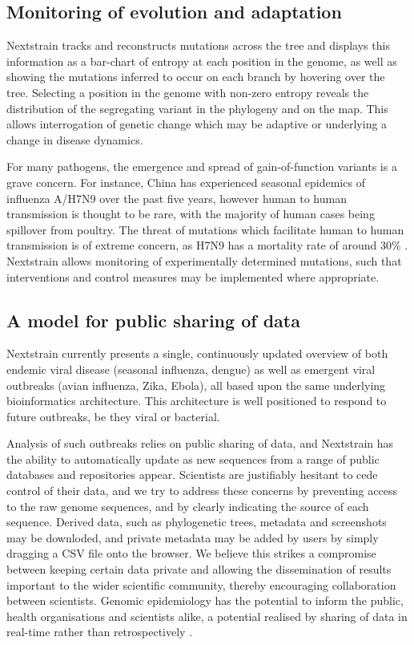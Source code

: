 \documentclass{bioinfo}
\begin{document}
\subsection*{Monitoring of evolution and adaptation}
Nextstrain tracks and reconstructs mutations across the tree and displays this information as a bar-chart of entropy at each position in the genome, as well as showing the mutations inferred to occur on each branch by hovering over the tree.
Selecting a position in the genome with non-zero entropy reveals the distribution of the segregating variant in the phylogeny and on the map.
This allows interrogation of genetic change which may be adaptive or underlying a change in disease dynamics.

For many pathogens, the emergence and spread of gain-of-function variants is a grave concern.
For instance, China has experienced seasonal epidemics of influenza A/H7N9 over the past five years, however human to human transmission is thought to be rare, with the majority of human cases being spillover from poultry.
The threat of mutations which facilitate human to human transmission is of extreme concern, as H7N9 has a mortality rate of around $30\%$ \citep{li2014epidemiology}.
Nextstrain allows monitoring of experimentally determined mutations, such that interventions and control measures may be implemented where appropriate.

\subsection*{A model for public sharing of data}
Nextstrain currently presents a single, continuously updated overview of both endemic viral disease (seasonal influenza, dengue) as well as emergent viral outbreaks (avian influenza, Zika, Ebola), all based upon the same underlying bioinformatics architecture.
This architecture is well positioned to respond to future outbreaks, be they viral or bacterial.

Analysis of such outbreaks relies on public sharing of data, and Nextstrain has the ability to automatically update as new sequences from a range of public databases and repositories appear.
Scientists are justifiably hesitant to cede control of their data, and we try to address these concerns by preventing access to the raw genome sequences, and by clearly indicating the source of each sequence.
Derived data, such as phylogenetic trees, metadata and screenshots may be downloded, and private metadata may be added by users by simply dragging a CSV file onto the browser.
We believe this strikes a compromise between keeping certain data private and allowing the dissemination of results important to the wider scientific community, thereby encouraging collaboration between scientists.
Genomic epidemiology has the potential to inform the public, health organisations and scientists alike, a potential realised by sharing of data in real-time rather than retrospectively \citep{croucher2015application}.
\end{document}
